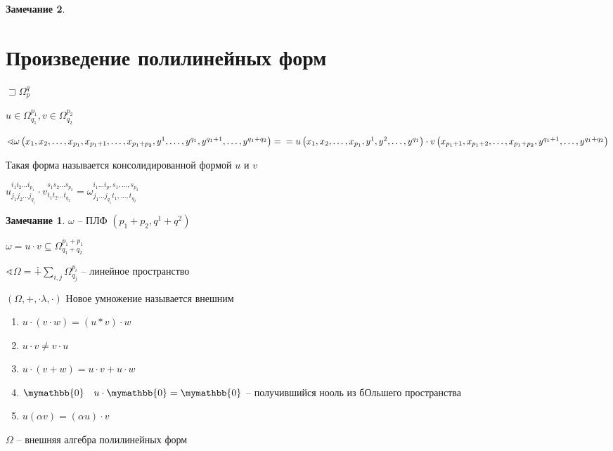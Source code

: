\documentclass{book}
\theoremstyle{definition}
\newtheorem*{note}{Замечание}
\begin{document}
\begin{note}
  \section{Произведение полилинейных форм}

$\sqsupset \Omega_p^q$

\begin{definition}
    $u\in \Omega_{q_1}^{p_1}, v\in \Omega_{q_2}^{p_2}$

    $\sphericalangle \omega \left( x_1, x_2, \ldots, x_{p_1}, x_{p_1+1}, \ldots, x_{p_1+p_2}, y^1, \ldots, y^{q_1}, y^{q_1+1}, \ldots, y^{q_1+q_2} \right) =\\ = u\left( x_1, x_2, \ldots, x_{p_1}, y^1, y^2, \ldots, y^{q_1} \right)  \cdot v\left( x_{p_1+1}, x_{p_1+2}, \ldots, x_{p_1+p_2}, y^{q_1+1}, \ldots, y^{q_1+q_2} \right) $ 

    Такая форма называется консолидированной формой $u$ и  $v$

    $u^{i_1 i_2 \ldots i_{p_1}}_{j_1 j_2 \ldots j_{q_1}} \cdot v_{t_1 t_2 \ldots t_{q_2}}^{s_1 s_2 \ldots s_{p_2}} = \omega^{i_1 \ldots i_p, s_1, \ldots, s_{p_2}}_{j_1 \ldots j_{q_1} t_1, \ldots, t_{q_2}}$
\end{definition}

\begin{note}
    $\omega$ -- ПЛФ  $(p_1+p_2, q^1+ q^2)$

    $\omega = u\cdot v \subseteq \Omega_{q_1+q_2}^{p_1+p_1}$

    $\sphericalangle \Omega = \dotplus \sum_{i, j} \Omega_{q_j}^{p_i}$ -- линейное пространство

    $\left( \Omega, +, \cdot \lambda, \cdot  \right) $ Новое умножение называется внешним
\end{note}

\begin{property}
    \begin{enumerate}
        \item $u\cdot (v\cdot w) = (u*v)\cdot w$
        \item $u\cdot v \neq  v \cdot  u$
        \item $u\cdot (v+w) = u\cdot v+u\cdot w$
        \item $\mymathbb{0}\quad u\cdot \mymathbb{0} = \mymathbb{0}$ -- получившийся нооль из бОльшего пространства
        \item $u(\alpha v) = (\alpha u)\cdot v$
    \end{enumerate}
\end{property}

\begin{definition}
    $\Omega$ -- внешняя алгебра полилинейных форм
\end{definition}
 \end{note}
\end{document}
